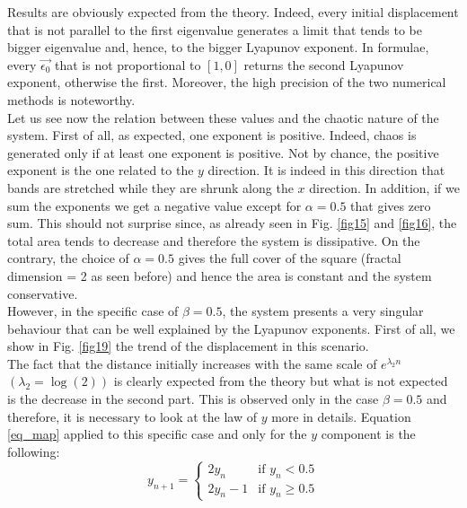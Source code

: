 \documentclass[11pt,titlepage]{article}
\begin{document}
Results are obviously expected from the theory. Indeed, every initial displacement that is not parallel to the first eigenvalue generates a limit that tends to be bigger eigenvalue and, hence, to the bigger Lyapunov exponent. In formulae, every $\vec{\epsilon_0}$ that is not proportional to $[1,0]$ returns the second Lyapunov exponent, otherwise the first. Moreover, the high precision of the two numerical methods is noteworthy. \\
Let us see now the relation between these values and the chaotic nature of the system. First of all, as expected, one exponent is positive. Indeed, chaos is generated only if at least one exponent is positive. Not by chance, the positive exponent is the one related to the $y$ direction. It is indeed in this direction that bands are stretched while they are shrunk along the $x$ direction. In addition, if we sum the exponents we get a negative value except for $\alpha=0.5$ that gives zero sum. This should not surprise since, as already seen in Fig. \ref{fig15} and \ref{fig16}, the total area tends to decrease and therefore the system is dissipative. On the contrary, the choice of $\alpha=0.5$ gives the full cover of the square (fractal dimension = 2 as seen before) and hence the area is constant and the system conservative. \\
However, in the specific case of $\beta=0.5$, the system presents a very singular behaviour that can be well explained by the Lyapunov exponents. First of all, we show in Fig. \ref{fig19} the trend of the displacement in this scenario. \\
The fact that the distance initially increases with the same scale of $e^{\lambda_2 n}$  $(\lambda_2=\log(2))$ is clearly expected from the theory but what is not expected is the decrease in the second part. This is observed only in the case $\beta=0.5$ and therefore, it is necessary to look at the law of $y$ more in details. Equation \ref{eq_map} applied to this specific case and only for the $y$ component is the following:
\begin{equation*}
	y_{n+1} = 
	\begin{cases}
		2y_n & \text{if } y_n < 0.5 \\
		2y_n -1 & \text{if } y_n \ge 0.5
	\end{cases}
\end{equation*}
\newpage
\end{document}
